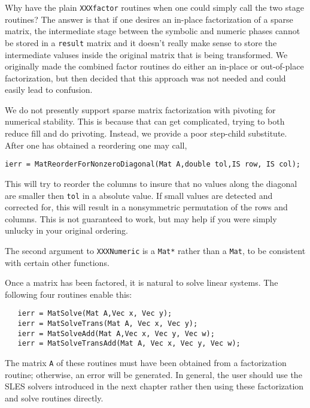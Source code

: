 \begin{design}
Why have the plain {\tt XXXfactor} routines when one could simply 
call the two stage routines? The answer is that if one desires an in-place 
factorization of a sparse matrix, the intermediate stage between the 
symbolic and numeric phases cannot be stored in a {\tt result} matrix and
it doesn't really make sense to store the intermediate valuses
 inside the original matrix 
that is being transformed.  We originally made the combined factor routines
do either an in-place or out-of-place factorization, but then decided that 
this approach was not needed and could easily lead to confusion.
\end{design}

We do not presently support sparse matrix factorization with pivoting 
for numerical stability. This is because that can get complicated, 
trying to both reduce fill and do privoting. Instead, we provide a 
poor step-child substitute. After one has obtained a reordering one may 
call,
\begin{verbatim}
ierr = MatReorderForNonzeroDiagonal(Mat A,double tol,IS row, IS col);
\end{verbatim}
This will try to reorder the columns to insure that no values along 
the diagonal are smaller then {\tt tol} in a absolute value. If small 
values are detected and corrected for, this will result in a nonsymmetric
permutation of the rows and columns. This is not guaranteed to work, 
but may help if you were simply unlucky in your original ordering.

\begin{design}
The second argument to {\tt XXXNumeric} is a {\tt Mat*} 
rather than a {\tt Mat}, to be consistent with  certain other functions.
\end{design}

Once a matrix has been factored, it is natural to solve linear systems.
The following four routines enable this:  
\begin{verbatim}
   ierr = MatSolve(Mat A,Vec x, Vec y);
   ierr = MatSolveTrans(Mat A, Vec x, Vec y);
   ierr = MatSolveAdd(Mat A,Vec x, Vec y, Vec w);
   ierr = MatSolveTransAdd(Mat A, Vec x, Vec y, Vec w);
\end{verbatim}
The  
matrix 
{\tt A} of these routines must have been obtained from a 
factorization routine; otherwise, an error will be generated.
In general, the user should use the SLES solvers introduced in the 
next chapter rather then using these factorization and solve routines
directly.

